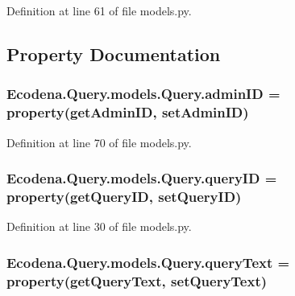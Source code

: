Definition at line 61 of file models.py.



\subsection{Property Documentation}
\hypertarget{class_ecodena_1_1_query_1_1models_1_1_query_a7397d58744f73dd037d7928ca7bb5593}{
\subsubsection[{adminID}]{\setlength{\rightskip}{0pt plus 5cm}Ecodena.Query.models.Query.adminID = property(getAdminID, setAdminID)}}
\label{de/d81/class_ecodena_1_1_query_1_1models_1_1_query_a7397d58744f73dd037d7928ca7bb5593}


Definition at line 70 of file models.py.

\hypertarget{class_ecodena_1_1_query_1_1models_1_1_query_a44a48f0e111c10ab2206c5dc44ca89af}{
\subsubsection[{queryID}]{\setlength{\rightskip}{0pt plus 5cm}Ecodena.Query.models.Query.queryID = property(getQueryID, setQueryID)}}
\label{de/d81/class_ecodena_1_1_query_1_1models_1_1_query_a44a48f0e111c10ab2206c5dc44ca89af}


Definition at line 30 of file models.py.

\hypertarget{class_ecodena_1_1_query_1_1models_1_1_query_a8c5d0779f4cfbe980fae5278a9837d69}{
\subsubsection[{queryText}]{\setlength{\rightskip}{0pt plus 5cm}Ecodena.Query.models.Query.queryText = property(getQueryText, setQueryText)}}
\label{de/d81/class_ecodena_1_1_query_1_1models_1_1_query_a8c5d0779f4cfbe980fae5278a9837d69}


